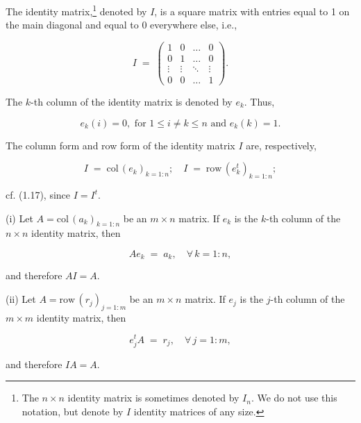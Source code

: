 The identity matrix,\footnote{The $n\times n$ identity matrix is sometimes
denoted by $I_n$. We do not use this notation, but denote by $I$ identity
matrices of any size.} denoted by $I$, is a square matrix with entries
equal to 1 on the main diagonal and equal to 0 everywhere else, i.e.,

\[
I \;=\; \begin{pmatrix} 1 & 0 & \ldots & 0 \\ 0 & 1 & \ldots & 0 \\
\vdots & \vdots & \ddots & \vdots \\ 0 & 0 & \ldots & 1 \end{pmatrix}.
\]

The $k$-th column of the identity matrix is denoted by $e_k$. Thus,

\begin{equation}
e_k(i) = 0, \text{ for } 1\le i\ne k\le n \text{ and } e_k(k)=1.
\end{equation}

The column form and row form of the identity matrix $I$ are, respectively,

\[
I \;=\; \mathrm{col}\,(e_k)_{k=1:n}; \quad I \;=\; \mathrm{row}\,(e_k^t)_{k=1:n};
\]

cf. (1.17), since $I=I^t$.

\begin{lemma}
(i) Let $A=\mathrm{col}\,(a_k)_{k=1:n}$ be an $m\times n$ matrix. If $e_k$
is the $k$-th column of the $n\times n$ identity matrix, then

\begin{equation}
Ae_k \;=\; a_k, \quad \forall\, k=1:n,
\end{equation}

and therefore $AI=A$.

(ii) Let $A=\mathrm{row}\,(r_j)_{j=1:m}$ be an $m\times n$ matrix. If $e_j$
is the $j$-th column of the $m\times m$ identity matrix, then

\begin{equation}
e_j^tA \;=\; r_j, \quad \forall\, j=1:m,
\end{equation}

and therefore $IA=A$.
\end{lemma}


